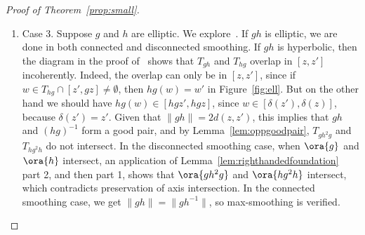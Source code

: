 \begin{proof}[Proof of Theorem~\ref{prop:small}]
\begin{enumerate}[wide, labelindent=0pt]
\begin{enumerate}
\begin{itemize}[wide, labelindent=0pt]
If $\| h \| \leq \Delta$, then $\| hg \| = 0$, as Paulin shows. 

However, by~\cite[Lemma~1.3]{Gui05:CoreTrees} (see proof of Lemma, subcase 1a therein), there exists $k$ large enough so that $h^k g$ is hyperbolic. By an analysis similar to the previous case $\| h \| > \Delta$, it follows that $T_{h^kg}$ and $T_{gh^k}$ are disjoint. On the other hand, an application of Lemma~\ref{lem:righthandedfoundation}, shows that $\ora{h^k g}$ and $\ora{gh^k}$ intersect for all $k>0$.
      \begin{figure}
\end{figure}
\item Suppose $T_h$ and $T_{ghg^{-1}}$ intersect in a ray $R_{\infty}$ with endpoint $x$.
This is similar to the preceeding subcase.

\end{itemize}
\end{enumerate}
\item Case 3. Suppose $g$ and $h$ are elliptic. We explore~\cite[Proposition~1.8]{Pa89:Paulin1989TheGT}.
If $gh$ is elliptic, we are done in both connected and disconnected smoothing.
If $gh$ is hyperbolic, then the diagram in the proof of~\cite[Proposition~1.8]{Pa89:Paulin1989TheGT} shows that
$T_{gh}$ and $T_{hg}$ overlap in $[z,z']$ incoherently. Indeed, the overlap can only be in $[z,z']$, since if $ w \in T_{hg} \cap [z',gz] \neq \emptyset$, then $hg(w)=w'$ in Figure~\ref{fig:ell}. But on the other hand we should have $hg(w) \in [hg z', hg z]$, since $w \in [\delta(z'), \delta(z)]$, because $\delta(z')=z'$.
Given that $\| gh \| = 2d(z,z')$, this implies that $gh$ and $(hg)^{-1}$ form a good pair, and by Lemma~\ref{lem:oppgoodpair},
$T_{gh^2g}$ and $T_{hg^2h}$ do not intersect.
In the disconnected smoothing case, when $\ora{g}$ and $\ora{h}$ intersect, an application of Lemma~\ref{lem:righthandedfoundation} part 2, and then part 1, shows that $\ora{gh^2g}$ and $\ora{hg^2 h}$ intersect, which contradicts preservation of axis intersection.
In the connected smoothing case, we get $\| gh \| = \| gh^{-1} \|$, so max-smoothing is verified.

      \begin{figure}
\end{figure}


\end{enumerate}
\end{proof}

